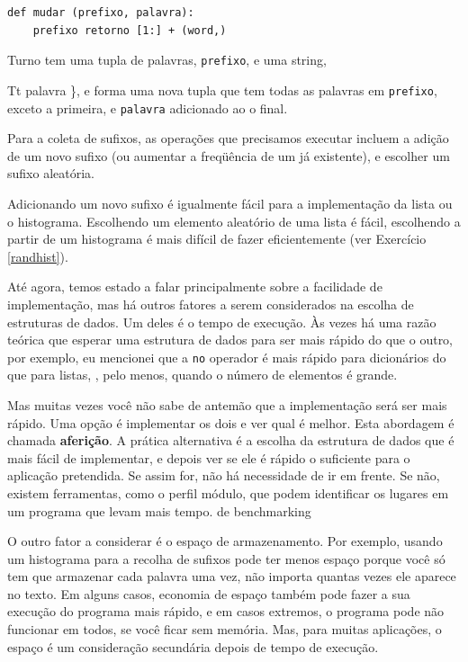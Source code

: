 \documentclass[10pt]{book}
\begin{document}
\begin{v erbatim}
\begin{verbatim}
def mudar (prefixo, palavra):
    prefixo retorno [1:] + (word,)
\end{verbatim}
%
{Turno \tt} tem uma tupla de palavras, {\tt prefixo}, e uma string, 
{Tt palavra \}, e forma uma nova tupla que tem todas as palavras
em {\tt prefixo}, exceto a primeira, e {\tt palavra} adicionado ao
o final.

Para a coleta de sufixos, as operações que precisamos
executar incluem a adição de um novo sufixo (ou aumentar a freqüência
de um já existente), e escolher um sufixo aleatória.

Adicionando um novo sufixo é igualmente fácil para a implementação da lista
ou o histograma. Escolhendo um elemento aleatório de uma lista
é fácil, escolhendo a partir de um histograma é mais difícil de fazer
eficientemente (ver Exercício ~ \ref {randhist}).

Até agora, temos estado a falar principalmente sobre a facilidade de implementação,
mas há outros fatores a serem considerados na escolha de estruturas de dados.
Um deles é o tempo de execução. Às vezes há uma razão teórica que esperar
uma estrutura de dados para ser mais rápido do que o outro, por exemplo, eu mencionei
que a {\tt no} operador é mais rápido para dicionários do que para listas,
, pelo menos, quando o número de elementos é grande.

Mas muitas vezes você não sabe de antemão que a implementação será
ser mais rápido. Uma opção é implementar os dois e ver qual
é melhor. Esta abordagem é chamada {\bf aferição}. A prática
alternativa é a escolha da estrutura de dados que é
mais fácil de implementar, e depois ver se ele é rápido o suficiente para o
aplicação pretendida. Se assim for, não há necessidade de ir em frente. Se não,
existem ferramentas, como o perfil {\tt} módulo, que podem identificar
os lugares em um programa que levam mais tempo.
\index{} de benchmarking

O outro fator a considerar é o espaço de armazenamento. Por exemplo, usando um
histograma para a recolha de sufixos pode ter menos espaço porque
você só tem que armazenar cada palavra uma vez, não importa quantas vezes ele
aparece no texto. Em alguns casos, economia de espaço também pode fazer a sua
execução do programa mais rápido, e em casos extremos, o programa pode não funcionar em
todos, se você ficar sem memória. Mas, para muitas aplicações, o espaço é um
consideração secundária depois de tempo de execução.

}
\end{v erbatim}
\end{document}
